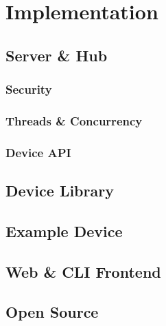 \chapter{Implementation} \label{cha:chapter2}

\section{Server \& Hub} \label{sec:chap3:server}
\subsection{Security} \label{sec:chap3:server:security}

\subsection{Threads \& Concurrency} \label{sec:chap3:server:threads}

\subsection{Device API} \label{sec:chap3:server:api}

\section{Device Library} \label{sec:chap3:devicelib}
\section{Example Device} \label{sec:chap3:deviceexample}
\section{Web \& CLI Frontend} \label{sec:chap3:frontend}
\section{Open Source} \label{sec:chap3:opensource}
